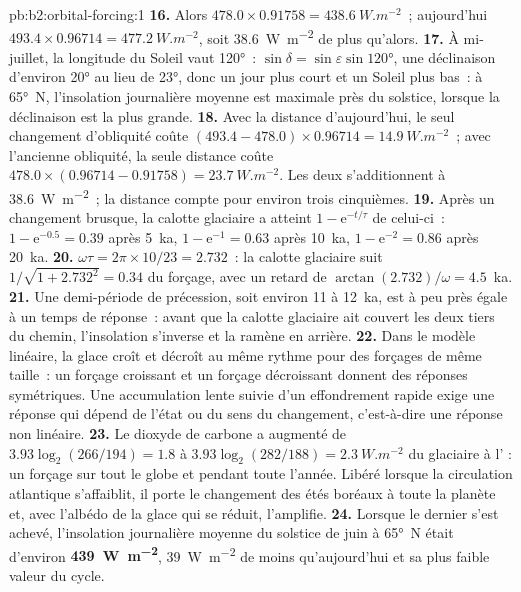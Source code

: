 \begin{solution}{pb:b2:orbital-forcing:1}
\textbf{16.} Alors $478.0 \times 0.91758 = \qty{438.6}{W.m^{-2}}$~; aujourd'hui $493.4 \times 0.96714 =
\qty{477.2}{W.m^{-2}}$, soit \qty{38.6}{W.m^{-2}} de plus qu'alors.
\textbf{17.} À mi-juillet, la longitude du Soleil vaut \ang{120}~: $\sin\delta = \sin\varepsilon\sin\ang{120}$,
une déclinaison d'environ \ang{20} au lieu de \ang{23}, donc un jour plus court et un Soleil plus bas~: à
\ang{65}~N, l'insolation journalière moyenne est maximale près du solstice, lorsque la déclinaison est la plus grande.
\textbf{18.} Avec la distance d'aujourd'hui, le seul changement d'obliquité coûte $(493.4 - 478.0) \times
0.96714 = \qty{14.9}{W.m^{-2}}$~; avec l'ancienne obliquité, la seule distance coûte $478.0 \times
(0.96714 - 0.91758) = \qty{23.7}{W.m^{-2}}$. Les deux s'additionnent à \qty{38.6}{W.m^{-2}}~; la distance
compte pour environ trois cinquièmes.
\textbf{19.} Après un changement brusque, la calotte glaciaire a atteint $1 - \mathrm e^{-t/\tau}$ de celui-ci~:
$1 - \mathrm e^{-0.5} = 0.39$ après \qty{5}{ka}, $1 - \mathrm e^{-1} = 0.63$ après \qty{10}{ka},
$1 - \mathrm e^{-2} = 0.86$ après \qty{20}{ka}.
\textbf{20.} $\omega\tau = 2\pi \times 10/23 = 2.732$~: la calotte glaciaire suit $1/\sqrt{1 + 2.732^2} =
0.34$ du forçage, avec un retard de $\arctan(2.732)/\omega = 4.5$~ka.
\textbf{21.} Une demi-période de précession, soit environ 11 à \qty{12}{ka}, est à peu près égale à un temps de réponse~: avant
que la calotte glaciaire ait couvert les deux tiers du chemin, l'insolation s'inverse et la ramène en arrière.
\textbf{22.} Dans le modèle linéaire, la glace croît et décroît au même rythme pour des forçages de même
taille~: un forçage croissant et un forçage décroissant donnent des réponses symétriques. Une accumulation lente suivie
d'un effondrement rapide exige une réponse qui dépend de l'état ou du sens du changement, c'est-à-dire
une réponse non linéaire.
\textbf{23.} Le dioxyde de carbone a augmenté de $3.93\log_2(266/194) = 1.8$ à $3.93\log_2(282/188) =
\qty{2.3}{W.m^{-2}}$ du glaciaire à l' : un forçage sur tout le globe et pendant toute l'année.
Libéré lorsque la circulation atlantique s'affaiblit, il porte le changement des étés boréaux à toute la planète et,
avec l'albédo de la glace qui se réduit, l'amplifie.
\textbf{24.} Lorsque le dernier  s'est achevé, l'insolation journalière moyenne du solstice de juin à
\ang{65}~N était d'environ \textbf{\qty{439}{W.m^{-2}}}, \qty{39}{W.m^{-2}} de moins qu'aujourd'hui et sa plus faible
valeur du cycle.
\end{solution}

